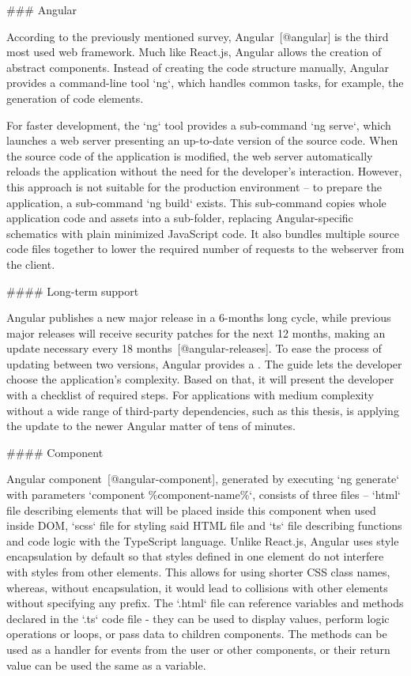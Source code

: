 \documentclass[
  digital, %
  oneside, %
  lof,     %
  nolot,     %
]{fithesis4}
\begin{document}
### Angular

According to the previously mentioned survey, Angular~[@angular] is the third most used web framework. Much like React.js, Angular allows the creation of abstract components. Instead of creating the code structure manually, Angular provides a command-line tool `ng`, which handles common tasks, for example, the generation of code elements.

For faster development, the `ng` tool provides a sub-command `ng serve`, which launches a web server presenting an up-to-date version of the source code. When the source code of the application is modified, the web server automatically reloads the application without the need for the developer's interaction. However, this approach is not suitable for the production environment -- to prepare the application, a sub-command `ng build` exists. This sub-command copies whole application code and assets into a sub-folder, replacing Angular-specific schematics with plain minimized JavaScript code. It also bundles multiple source code files together to lower the required number of requests to the webserver from the client.

#### Long-term support

Angular publishes a new major release in a 6-months long cycle, while previous major releases will receive security patches for the next 12 months, making an update necessary every 18 months~[@angular-releases]. To ease the process of updating between two versions, Angular provides a . The guide lets the developer choose the application's complexity. Based on that, it will present the developer with a checklist of required steps. For applications with medium complexity without a wide range of third-party dependencies, such as this thesis, is applying the update to the newer Angular matter of tens of minutes.

#### Component

Angular component~[@angular-component], generated by executing `ng generate` with parameters `component \%component-name\%`, consists of three files -- `html` file describing elements that will be placed inside this component when used inside \acrshort{DOM}, `scss` file for styling said \acrshort{HTML} file and `ts` file describing functions and code logic with the TypeScript language. Unlike React.js, Angular uses style encapsulation by default so that styles defined in one element do not interfere with styles from other elements. This allows for using shorter \acrshort{CSS} class names, whereas, without encapsulation, it would lead to collisions with other elements without specifying any prefix. The `.html` file can reference variables and methods declared in the `.ts` code file - they can be used to display values, perform logic operations or loops, or pass data to children components. The methods can be used as a handler for events from the user or other components, or their return value can be used the same as a variable.
\end{document}

